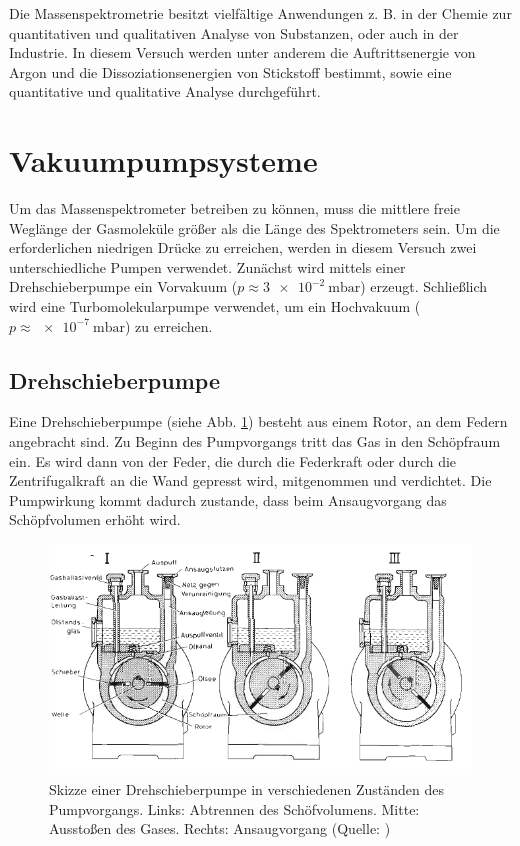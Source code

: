 Die Massenspektrometrie besitzt vielfältige Anwendungen z. B. in der Chemie zur quantitativen und qualitativen Analyse von Substanzen, oder auch in der Industrie.
In diesem Versuch werden unter anderem die Auftrittsenergie von Argon und die Dissoziationsenergien von Stickstoff bestimmt, sowie eine quantitative und qualitative Analyse durchgeführt.

\section{Vakuumpumpsysteme}
Um das Massenspektrometer betreiben zu können, muss die mittlere freie Weglänge der Gasmoleküle größer als die Länge des Spektrometers sein. Um die erforderlichen niedrigen Drücke zu erreichen, werden in diesem Versuch zwei unterschiedliche Pumpen verwendet.
Zunächst wird mittels einer Drehschieberpumpe ein Vorvakuum ($p\approx\SI{3e-2}{\milli\bar}$) erzeugt. Schließlich wird eine Turbomolekularpumpe verwendet, um ein Hochvakuum ($p\approx\SI{e-7}{\milli\bar}$) zu erreichen.

\subsection{Drehschieberpumpe}

Eine Drehschieberpumpe (siehe Abb. \ref{fig011}) besteht aus einem Rotor, an dem Federn angebracht sind. Zu Beginn des Pumpvorgangs tritt das Gas in den Schöpfraum ein. Es wird dann von der Feder, die durch die Federkraft oder durch die Zentrifugalkraft an die Wand gepresst wird, mitgenommen und verdichtet.
Die Pumpwirkung kommt dadurch zustande, dass beim Ansaugvorgang das Schöpfvolumen erhöht wird.

\begin{figure}[tb]
 \centering
 \includegraphics[scale=0.7]{./fig/massenspek_drehschieber.png}
 \caption{Skizze einer Drehschieberpumpe in verschiedenen Zuständen des Pumpvorgangs. Links: Abtrennen des Schöfvolumens. Mitte: Ausstoßen des Gases. Rechts: Ansaugvorgang (Quelle: \cite[S. 7]{Litmap})}
 \label{fig011}
\end{figure}

